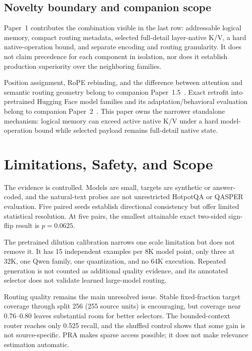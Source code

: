 \documentclass[11pt]{article}
\begin{document}
\subsection{Novelty boundary and companion scope}

Paper~1 contributes the combination visible in the last row: addressable logical memory,
compact routing metadata, selected full-detail layer-native K/V,
a hard native-operation bound, and separate encoding and routing granularity.
It does not claim precedence for each component in isolation,
nor does it establish production superiority over the neighboring families.

Position assignment, RoPE rebinding, and the difference between attention and semantic
routing geometry belong to companion Paper~1.5~\cite{simao2026position}.
Exact retrofit into pretrained Hugging Face model families and its adaptation/behavioral
evaluation belong to companion Paper~2~\cite{simao2026hf}.
This paper owns the narrower standalone mechanism:
logical memory can exceed active native K/V under a hard model-operation bound while
selected payload remains full-detail native state.

\section{Limitations, Safety, and Scope}
\label{sec:limitations}

The evidence is controlled. Models are small, targets are synthetic or answer-coded,
and the natural-text probes are not unrestricted HotpotQA or QASPER evaluation.
Five paired seeds establish directional consistency but offer limited statistical
resolution. At five pairs, the smallest attainable exact two-sided sign-flip result is
$p=0.0625$.

The pretrained dilution calibration narrows one scale limitation but does not remove it.
It has 15 independent examples per 8K model point, only three at 32K, one Qwen family,
one quantization, and no 64K execution. Repeated generation is not counted as additional
quality evidence, and its annotated selector does not validate learned large-model
routing.

Routing quality remains the main unresolved issue.
Stable fixed-fraction target coverage through split 256 (255 source units) is
encouraging, but coverage near 0.76--0.80 leaves substantial room for better selectors.
The bounded-context router reaches only 0.525 recall,
and the shuffled control shows that some gain is not source-specific.
PRA makes sparse access possible; it does not make relevance estimation automatic.
\end{document}
